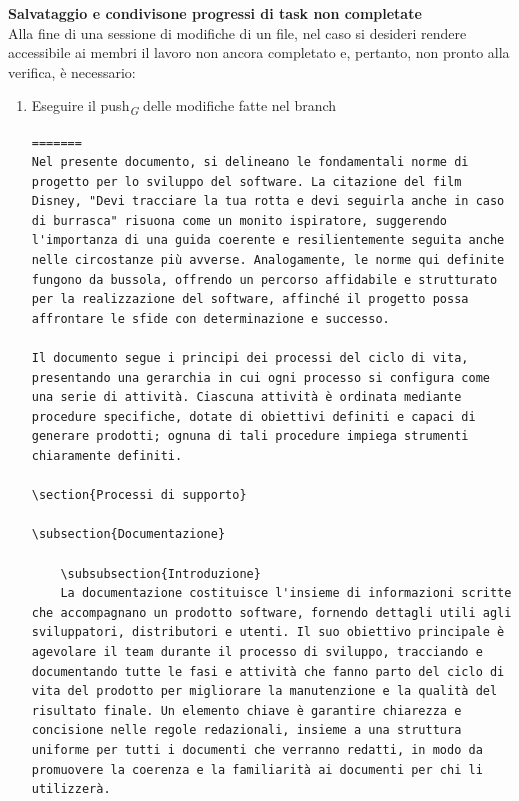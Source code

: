 \documentclass{article}
\begin{document}
\textbf{Salvataggio e condivisone progressi di task non completate}\\
Alla fine di una sessione di modifiche di un file, nel caso si desideri rendere accessibile ai membri il lavoro non ancora completato e, pertanto, non pronto alla verifica, è necessario:
\begin{enumerate}
    \item Eseguire il push\textsubscript{\textit{G}}  delle modifiche fatte nel branch
          \begin{lstlisting}[style=code]
=======
Nel presente documento, si delineano le fondamentali norme di progetto per lo sviluppo del software. La citazione del film Disney, "Devi tracciare la tua rotta e devi seguirla anche in caso di burrasca" risuona come un monito ispiratore, suggerendo l'importanza di una guida coerente e resilientemente seguita anche nelle circostanze più avverse. Analogamente, le norme qui definite fungono da bussola, offrendo un percorso affidabile e strutturato per la realizzazione del software, affinché il progetto possa affrontare le sfide con determinazione e successo.

Il documento segue i principi dei processi del ciclo di vita, presentando una gerarchia in cui ogni processo si configura come una serie di attività. Ciascuna attività è ordinata mediante procedure specifiche, dotate di obiettivi definiti e capaci di generare prodotti; ognuna di tali procedure impiega strumenti chiaramente definiti.

\section{Processi di supporto}

\subsection{Documentazione}
    
    \subsubsection{Introduzione}
    La documentazione costituisce l'insieme di informazioni scritte che accompagnano un prodotto software, fornendo dettagli utili agli sviluppatori, distributori e utenti. Il suo obiettivo principale è agevolare il team durante il processo di sviluppo, tracciando e documentando tutte le fasi e attività che fanno parto del ciclo di vita del prodotto per migliorare la manutenzione e la qualità del risultato finale. Un elemento chiave è garantire chiarezza e concisione nelle regole redazionali, insieme a una struttura uniforme per tutti i documenti che verranno redatti, in modo da promuovere la coerenza e la familiarità ai documenti per chi li utilizzerà. 
    

\end{lstlisting}
\end{enumerate}
\end{document}
